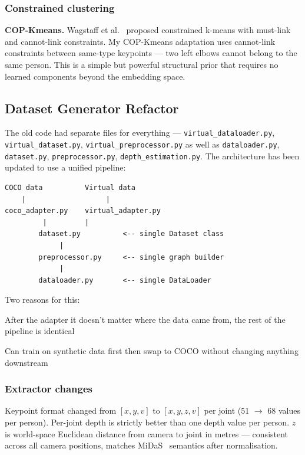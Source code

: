 \subsubsection{Constrained clustering}

\textbf{COP-Kmeans.} Wagstaff et al.~\cite{wagstaff2001copkmeans} proposed constrained k-means with must-link and cannot-link constraints. My COP-Kmeans adaptation uses cannot-link constraints between same-type keypoints --- two left elbows cannot belong to the same person. This is a simple but powerful structural prior that requires no learned components beyond the embedding space.


\subsection{Dataset Generator Refactor}

The old code had separate files for everything --- \texttt{virtual\_dataloader.py}, \texttt{virtual\_dataset.py}, \texttt{virtual\_preprocessor.py} as well as \texttt{dataloader.py}, \texttt{dataset.py}, \texttt{preprocessor.py}, \texttt{depth\_estimation.py}. The architecture has been updated to use a unified pipeline:

\begin{verbatim}
COCO data          Virtual data
    |                   |
coco_adapter.py    virtual_adapter.py
         |         |
        dataset.py          <-- single Dataset class
             |
        preprocessor.py     <-- single graph builder
             |
        dataloader.py       <-- single DataLoader
\end{verbatim}

Two reasons for this:
\begin{compactitem}
  \item After the adapter it doesn't matter where the data came from, the rest of the pipeline is identical
  \item Can train on synthetic data first then swap to COCO without changing anything downstream
\end{compactitem}


\subsubsection{Extractor changes}

Keypoint format changed from $[x,y,v]$ to $[x,y,z,v]$ per joint (51 $\to$ 68 values per person). Per-joint depth is strictly better than one depth value per person. $z$ is world-space Euclidean distance from camera to joint in metres --- consistent across all camera positions, matches MiDaS~\cite{ranftl2020midas} semantics after normalisation.

